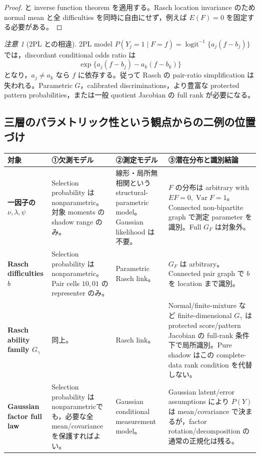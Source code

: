 \documentclass[11pt,a4paper]{ltjsarticle}
\theoremstyle{remark}
\newtheorem{remark}{注意}[section]
\newcommand{\Var}{\operatorname{Var}}
\begin{document}
\begin{proof}
 と inverse function theorem を適用する。Rasch location invariance のため normal mean と全 difficulties を同時に自由にせず，例えば $E(F)=0$ を固定する必要がある。
\end{proof}

\begin{remark}[2PL との相違]
2PL model $P(Y_j=1\mid F=f)=\operatorname{logit}^{-1}\{a_j(f-b_j)\}$ では，discordant conditional odds ratio は
\[
\exp\{a_j(f-b_j)-a_k(f-b_k)\}
\]
となり，$a_j\ne a_k$ なら $f$ に依存する。従って Rasch の pair-ratio simplification は失われる。Parametric $G$，calibrated discriminations，より豊富な protected pattern probabilities，または一般 quotient Jacobian の full rank が必要になる。
\end{remark}

\subsection{三層のパラメトリック性という観点からの二例の位置づけ}
\begin{center}
\small
\begin{tabularx}{0.98\textwidth}{>{\bfseries}p{32mm}p{35mm}p{38mm}X}
\toprule
対象 & ①欠測モデル & ②測定モデル & ③潜在分布と識別結論\\
\midrule
一因子の $\nu,\lambda,\psi$
& Selection probability は nonparametric。対象 moments の shadow range のみ。
& 線形・局所無相関という structural-parametric model。Gaussian likelihood は不要。
& $F$ の分布は arbitrary with $E F=0,\Var F=1$。Connected non-bipartite graph で測定 parameter を識別。Full $G_F$ は対象外。\\
Rasch difficulties $b$
& Selection probability は nonparametric。Pair cells $10,01$ の representer のみ。
& Parametric Rasch link。
& $G_F$ は arbitrary。Connected pair graph で $b$ を location まで識別。\\
Rasch ability family $G_\gamma$
& 同上。
& Rasch link。
& Normal/finite-mixture など finite-dimensional $G_\gamma$ は protected score/pattern Jacobian の full-rank 条件下で局所識別。Pure shadow はこの complete-data rank condition を代替しない。\\
Gaussian factor full law
& Selection probability は nonparametricでも，必要な全 mean/covariance を保護すればよい。
& Gaussian conditional measurement model。
& Gaussian latent/error assumptions により $P(Y)$ は mean/covariance で決まるが，factor rotation/decomposition の通常の正規化は残る。\\
\bottomrule
\end{tabularx}
\end{center}
\end{document}

